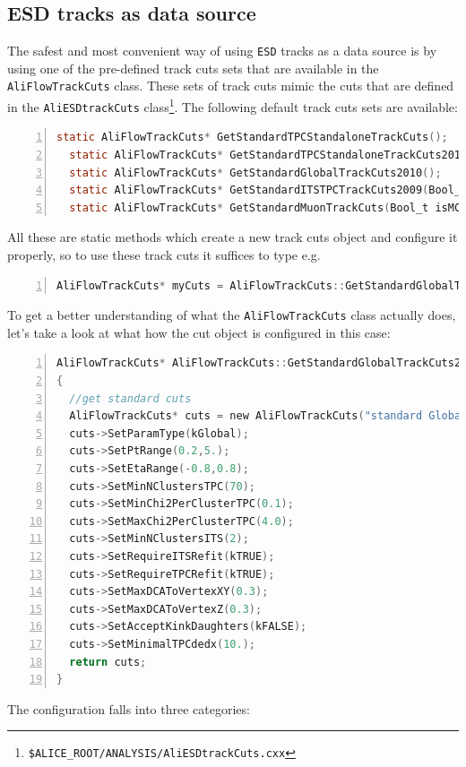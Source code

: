 \documentclass[a4paper]{book}
\numberwithin{equation}{subsection}
\begin{document}
\subsection{ESD tracks as data source}
The safest and most convenient way of using \texttt{ESD} tracks as a data source is by using one of the pre-defined track cuts sets that are available in the \texttt{AliFlowTrackCuts} class. These sets of track cuts mimic the cuts that are defined in the \texttt{AliESDtrackCuts} class\footnote{\texttt{\$ALICE\_ROOT/ANALYSIS/AliESDtrackCuts.cxx}}. The following default track cuts sets are available:
\begin{lstlisting}[language=C, numbers=left]
  static AliFlowTrackCuts* GetStandardTPCStandaloneTrackCuts();
  static AliFlowTrackCuts* GetStandardTPCStandaloneTrackCuts2010();
  static AliFlowTrackCuts* GetStandardGlobalTrackCuts2010();
  static AliFlowTrackCuts* GetStandardITSTPCTrackCuts2009(Bool_t selPrimaries=kTRUE);
  static AliFlowTrackCuts* GetStandardMuonTrackCuts(Bool_t isMC=kFALSE, Int_t passN=2);
  \end{lstlisting}
All these are static methods which create a new track cuts object and configure it properly, so to use these track cuts it suffices to type e.g.
\begin{lstlisting}[language=C, numbers=left]
AliFlowTrackCuts* myCuts = AliFlowTrackCuts::GetStandardGlobalTrackCuts2010();\end{lstlisting}
To get a better understanding of what the \texttt{AliFlowTrackCuts} class actually does, let's take a look at what how the cut object is configured in this case:
\begin{lstlisting}[language=C, numbers=left]
AliFlowTrackCuts* AliFlowTrackCuts::GetStandardGlobalTrackCuts2010()
{
  //get standard cuts
  AliFlowTrackCuts* cuts = new AliFlowTrackCuts("standard Global tracks");
  cuts->SetParamType(kGlobal);
  cuts->SetPtRange(0.2,5.);
  cuts->SetEtaRange(-0.8,0.8);
  cuts->SetMinNClustersTPC(70);
  cuts->SetMinChi2PerClusterTPC(0.1);
  cuts->SetMaxChi2PerClusterTPC(4.0);
  cuts->SetMinNClustersITS(2);
  cuts->SetRequireITSRefit(kTRUE);
  cuts->SetRequireTPCRefit(kTRUE);
  cuts->SetMaxDCAToVertexXY(0.3);
  cuts->SetMaxDCAToVertexZ(0.3);
  cuts->SetAcceptKinkDaughters(kFALSE);
  cuts->SetMinimalTPCdedx(10.);
  return cuts;
}\end{lstlisting}
The configuration falls into three categories:
\end{document}
